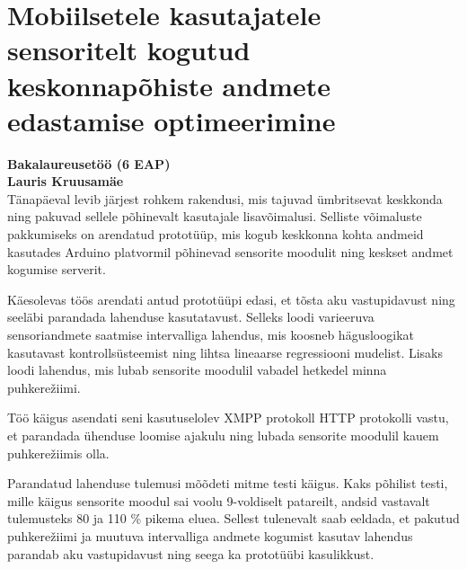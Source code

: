 \chapter[Resümee]{Mobiilsetele kasutajatele sensoritelt kogutud keskonnapõhiste andmete edastamise optimeerimine} %
\textbf{Bakalaureusetöö (6 EAP)}\\
\textbf{Lauris Kruusamäe}\\

Tänapäeval levib järjest rohkem rakendusi, mis tajuvad ümbritsevat keskkonda ning pakuvad sellele põhinevalt kasutajale lisavõimalusi. Selliste võimaluste pakkumiseks on arendatud prototüüp, mis kogub keskkonna kohta andmeid kasutades Arduino platvormil põhinevad sensorite moodulit ning keskset andmet kogumise serverit. 

Käesolevas töös arendati antud prototüüpi edasi, et tõsta aku vastupidavust ning seeläbi parandada lahenduse kasutatavust. Selleks loodi varieeruva sensoriandmete saatmise intervalliga lahendus, mis koosneb hägusloogikat kasutavast kontrollsüsteemist ning lihtsa lineaarse regressiooni mudelist. Lisaks loodi lahendus, mis lubab sensorite moodulil vabadel hetkedel minna puhkerežiimi.

Töö käigus asendati seni kasutuselolev XMPP protokoll HTTP protokolli vastu, et parandada ühenduse loomise ajakulu ning lubada sensorite moodulil kauem puhkerežiimis olla.

Parandatud lahenduse tulemusi mõõdeti mitme testi käigus. Kaks põhilist testi, mille käigus sensorite moodul sai voolu 9-voldiselt patareilt, andsid vastavalt tulemusteks 80 ja 110 \% pikema eluea. Sellest tulenevalt saab eeldada, et pakutud puhkerežiimi ja muutuva intervalliga andmete kogumist kasutav lahendus parandab aku vastupidavust ning seega ka prototüübi kasulikkust.




\ifpdf
    \graphicspath{{7/figures/PNG/}{7/figures/PDF/}{7/figures/}}
\else
    \graphicspath{{7/figures/EPS/}{7/figures/}}
\fi








